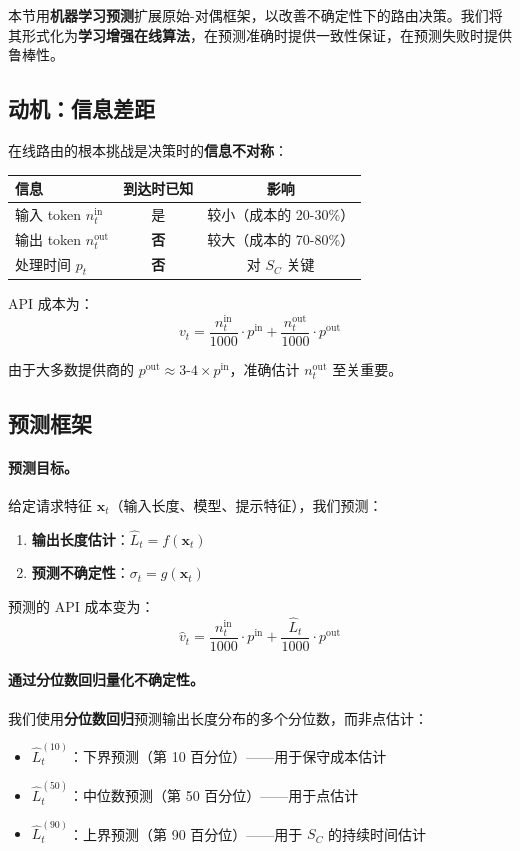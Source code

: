 \documentclass[11pt]{article}
\begin{document}
本节用\textbf{机器学习预测}扩展原始-对偶框架，以改善不确定性下的路由决策。我们将其形式化为\textbf{学习增强在线算法}，在预测准确时提供一致性保证，在预测失败时提供鲁棒性。

\subsection{动机：信息差距}

在线路由的根本挑战是决策时的\textbf{信息不对称}：

\begin{center}
\begin{tabular}{|l|c|c|}
\hline
\textbf{信息} & \textbf{到达时已知} & \textbf{影响} \\
\hline
输入 token $n^{\text{in}}_t$ & 是 & 较小（成本的 20-30\%）\\
输出 token $n^{\text{out}}_t$ & \textbf{否} & 较大（成本的 70-80\%）\\
处理时间 $p_t$ & \textbf{否} & 对 $S_C$ 关键 \\
\hline
\end{tabular}
\end{center}

API 成本为：
\[ v_t = \frac{n^{\text{in}}_t}{1000} \cdot p^{\text{in}} + \frac{n^{\text{out}}_t}{1000} \cdot p^{\text{out}} \]

由于大多数提供商的 $p^{\text{out}} \approx 3\text{-}4 \times p^{\text{in}}$，准确估计 $n^{\text{out}}_t$ 至关重要。

\subsection{预测框架}

\paragraph{预测目标。}
给定请求特征 $\mathbf{x}_t$（输入长度、模型、提示特征），我们预测：
\begin{enumerate}
  \item \textbf{输出长度估计}：$\hat{L}_t = f(\mathbf{x}_t)$
  \item \textbf{预测不确定性}：$\sigma_t = g(\mathbf{x}_t)$
\end{enumerate}

预测的 API 成本变为：
\[ \hat{v}_t = \frac{n^{\text{in}}_t}{1000} \cdot p^{\text{in}} + \frac{\hat{L}_t}{1000} \cdot p^{\text{out}} \]

\paragraph{通过分位数回归量化不确定性。}
我们使用\textbf{分位数回归}预测输出长度分布的多个分位数，而非点估计：
\begin{itemize}
  \item $\hat{L}^{(10)}_t$：下界预测（第 10 百分位）——用于保守成本估计
  \item $\hat{L}^{(50)}_t$：中位数预测（第 50 百分位）——用于点估计
  \item $\hat{L}^{(90)}_t$：上界预测（第 90 百分位）——用于 $S_C$ 的持续时间估计
\end{itemize}
\end{document}
